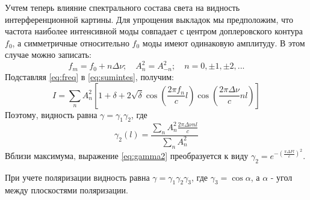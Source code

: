 \documentclass[a4paper,12pt]{article}
\begin{document}
Учтем теперь влияние спектрального состава света на видность интерференционной картины. Для упрощения выкладок мы предположим, что частота наиболее интенсивной моды совпадает с центром доплеровского
контура $f_0$, а симметричные относительно $f_0$ моды имеют одинаковую амплитуду. В этом случае можно записать:
\begin{equation}\label{eq:freq}
f_m = f_0 + n\Delta\nu; \quad A^2_n = A^2_{-n}; \quad n = 0, \pm 1, \pm 2, ...
\end{equation}
Подставляя \eqref{eq:freq} в \eqref{eq:sumintes}, получим:
\begin{equation}\label{eq:sumintes2}
I =  \sum\limits_n A^2_n\left[ 1 + \delta + 2\sqrt{\delta}\cos{\left(\frac{2\pi f_n}{c}l\right)}\cos{\left(\frac{2\pi\Delta\nu}{c}n l\right)}\right]
\end{equation}
Поэтому, видность равна $\gamma = \gamma_1\gamma_2$, где
\begin{equation}\label{eq:gamma2}
\gamma_2(l) = \frac{\sum\limits_n A^2_n \frac{2\pi\Delta\nu n l}{c}}{\sum\limits_n A^2_n}
\end{equation}
Вблизи максимума, выражение \eqref{eq:gamma2} преобразуется к виду $\gamma_2 = e^{-\left(\frac{\pi\Delta F l}{c}\right)^2}$.

При учете поляризации видность равна $\gamma = \gamma_1\gamma_2\gamma_3$, где $\gamma_3 = \cos\alpha$, а $\alpha$ - угол между плоскостями поляризации.
\end{document}
